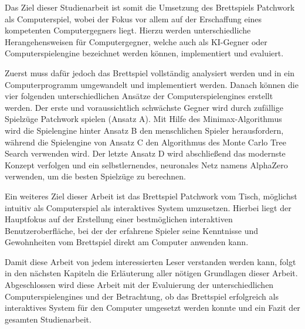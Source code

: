 Das Ziel dieser Studienarbeit ist somit die Umsetzung des Brettspiels Patchwork als Computerspiel, wobei der Fokus vor allem auf der Erschaffung eines kompetenten Computergegners liegt. Hierzu werden unterschiedliche Herangehensweisen für Computergegner, welche auch als \ac{KI}-Gegner oder Computerspielengine bezeichnet werden können, implementiert und evaluiert.

Zuerst muss dafür jedoch das Brettspiel vollständig analysiert werden und in ein Computerprogramm umgewandelt und implementiert werden. Danach können die vier folgenden unterschiedlichen Ansätze der Computerspielengines erstellt werden. Der erste und voraussichtlich schwächste Gegner wird durch zufällige Spielzüge Patchwork spielen (Ansatz A). Mit Hilfe des Minimax-Algorithmus wird die Spielengine hinter Ansatz B den menschlichen Spieler herausfordern, während die Spielengine von Ansatz C den Algorithmus des Monte Carlo Tree Search verwenden wird. Der letzte Ansatz D wird abschließend das modernste Konzept verfolgen und ein selbstlernendes, neuronales Netz namens AlphaZero verwenden, um die besten Spielzüge zu berechnen.

Ein weiteres Ziel dieser Arbeit ist das Brettspiel Patchwork vom Tisch, möglichst intuitiv als Computerspiel als interaktives System umzusetzen. Hierbei liegt der Hauptfokus auf der Erstellung einer bestmöglichen interaktiven Benutzeroberfläche, bei der der erfahrene Spieler seine Kenntnisse und Gewohnheiten vom Brettspiel direkt am Computer anwenden kann.

Damit diese Arbeit von jedem interessierten Leser verstanden werden kann, folgt in den nächsten Kapiteln die Erläuterung aller nötigen Grundlagen dieser Arbeit. Abgeschlossen wird diese Arbeit mit der Evaluierung der unterschiedlichen Computerspielengines und der Betrachtung, ob das Brettspiel erfolgreich als interaktives System für den Computer umgesetzt werden konnte und ein Fazit der gesamten Studienarbeit.
